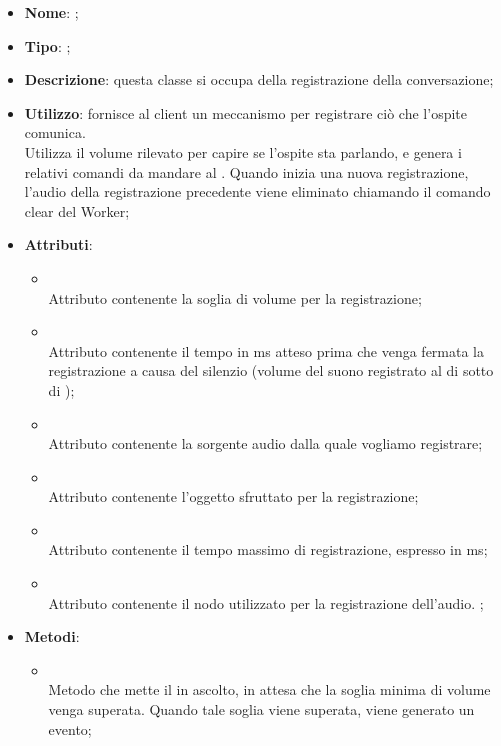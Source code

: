 \begin{itemize}
	\item \textbf{Nome}: ;
	\item \textbf{Tipo}: ;
	\item \textbf{Descrizione}: questa classe si occupa della registrazione della conversazione;
	\item \textbf{Utilizzo}: fornisce al client un meccanismo per registrare ciò che l'ospite comunica. \\
Utilizza il volume rilevato per capire se l'ospite sta parlando, e genera i relativi comandi da mandare al . Quando inizia una nuova registrazione, l'audio della registrazione precedente viene eliminato chiamando il comando clear del Worker;
	\item \textbf{Attributi}:
	\begin{itemize}
		\item[]  \\
		Attributo contenente la soglia di volume per la registrazione;
		\item[]  \\
		Attributo contenente il tempo in ms atteso prima che venga fermata la registrazione a causa del silenzio (volume del suono registrato al di sotto di );
		\item[]  \\
		Attributo contenente la sorgente audio dalla quale vogliamo registrare;
		\item[]  \\
		Attributo contenente l'oggetto  sfruttato per la registrazione;
		\item[]  \\
		Attributo contenente il tempo massimo di registrazione, espresso in ms;
		\item[]  \\
		Attributo contenente il nodo utilizzato per la registrazione dell'audio. ;
	\end{itemize}
	\item \textbf{Metodi}:
	\begin{itemize}
		\item[]  \\
		Metodo che mette il  in ascolto, in attesa che la soglia minima di volume venga superata. Quando tale soglia viene superata, viene generato un evento;\\

\end{itemize}
\end{itemize}
